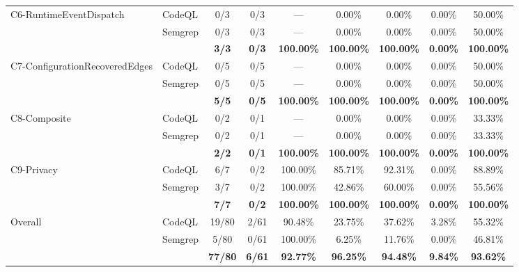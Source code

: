 \begin{table}[t]
\begin{tabular}{l|l|c|c|c|c|c|c|c}
\hline
\multirow{3}{*}{C6-RuntimeEventDispatch} & CodeQL & 0/3 & 0/3 & --- & 0.00\% & 0.00\% & 0.00\% & 50.00\% \\
 & Semgrep & 0/3 & 0/3 & --- & 0.00\% & 0.00\% & 0.00\% & 50.00\% \\
 & \sys{} & \textbf{3/3} & \textbf{0/3} & \textbf{100.00\%} & \textbf{100.00\%} & \textbf{100.00\%} & \textbf{0.00\%} & \textbf{100.00\%} \\
\hline
\multirow{3}{*}{C7-ConfigurationRecoveredEdges} & CodeQL & 0/5 & 0/5 & --- & 0.00\% & 0.00\% & 0.00\% & 50.00\% \\
 & Semgrep & 0/5 & 0/5 & --- & 0.00\% & 0.00\% & 0.00\% & 50.00\% \\
 & \sys{} & \textbf{5/5} & \textbf{0/5} & \textbf{100.00\%} & \textbf{100.00\%} & \textbf{100.00\%} & \textbf{0.00\%} & \textbf{100.00\%} \\
\hline
\multirow{3}{*}{C8-Composite} & CodeQL & 0/2 & 0/1 & --- & 0.00\% & 0.00\% & 0.00\% & 33.33\% \\
 & Semgrep & 0/2 & 0/1 & --- & 0.00\% & 0.00\% & 0.00\% & 33.33\% \\
 & \sys{} & \textbf{2/2} & \textbf{0/1} & \textbf{100.00\%} & \textbf{100.00\%} & \textbf{100.00\%} & \textbf{0.00\%} & \textbf{100.00\%} \\
\hline
\multirow{3}{*}{C9-Privacy} & CodeQL & 6/7 & 0/2 & 100.00\% & 85.71\% & 92.31\% & 0.00\% & 88.89\% \\
 & Semgrep & 3/7 & 0/2 & 100.00\% & 42.86\% & 60.00\% & 0.00\% & 55.56\% \\
 & \sys{} & \textbf{7/7} & \textbf{0/2} & \textbf{100.00\%} & \textbf{100.00\%} & \textbf{100.00\%} & \textbf{0.00\%} & \textbf{100.00\%} \\
\hline
\multirow{3}{*}{Overall} & CodeQL & 19/80 & 2/61 & 90.48\% & 23.75\% & 37.62\% & 3.28\% & 55.32\% \\
 & Semgrep & 5/80 & 0/61 & 100.00\% & 6.25\% & 11.76\% & 0.00\% & 46.81\% \\
 & \sys{} & \textbf{77/80} & \textbf{6/61} & \textbf{92.77\%} & \textbf{96.25\%} & \textbf{94.48\%} & \textbf{9.84\%} & \textbf{93.62\%} \\
\hline
\end{tabular}
\end{table}
